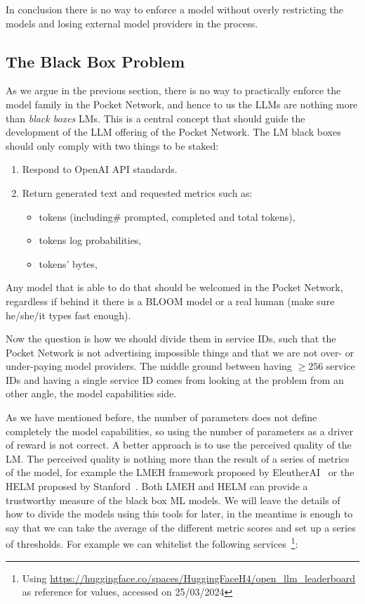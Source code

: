 In conclusion there is no way to enforce a model without overly restricting the models and losing external model providers in the process.

\newpage
\subsection{The Black Box Problem}
As we argue in the previous section, there is no way to practically enforce the model family in the Pocket Network, and hence to us the \glspl{LLM} are nothing more than \emph{black boxes} \glspl{LM}. This is a central concept that should guide the development of the \gls{LLM} offering of the Pocket Network.
The \gls{LM} black boxes should only comply with two things to be staked:
\begin{enumerate}
    \item Respond to OpenAI API standards.
    \item Return generated text and requested metrics such as:
    \begin{itemize}
        \item tokens (including\# prompted, completed and total tokens),
        \item tokens log probabilities,
        \item tokens' bytes,
    \end{itemize}
\end{enumerate}
Any model that is able to do that should be welcomed in the Pocket Network, regardless if behind it there is a BLOOM model or a real human (make sure he/she/it types fast enough).

Now the question is how we should divide them in service IDs, such that the Pocket Network is not advertising impossible things and that we are not over- or under-paying model providers. The middle ground between having $\ge 256$ service IDs and having a single service ID comes from looking at the problem from an other angle, the model capabilities side.

As we have mentioned before, the number of parameters does not define completely the model capabilities, so using the number of parameters as a driver of reward is not correct. A better approach is to use the perceived quality of the \gls{LM}. The perceived quality is nothing more than the result of a series of metrics of the model, for example the \gls{LMEH} framework proposed by EleutherAI~\cite{eval-harness} or the \gls{HELM} proposed by Stanford~\cite{liang_holistic_2023}. Both \gls{LMEH} and \gls{HELM} can provide a trustworthy measure of the black box \gls{ML} models. We will leave the details of how to divide the models using this tools for later, in the meantime is enough to say that we can take the average of the different metric scores and set up a series of thresholds. For example we can whitelist the following services~\footnote{Using \url{https://huggingface.co/spaces/HuggingFaceH4/open_llm_leaderboard} as reference for values, accessed on 25/03/2024}:

